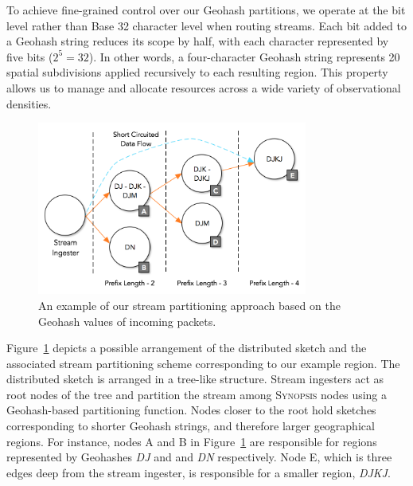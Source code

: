 To achieve fine-grained control over our Geohash partitions, we operate at the bit level rather than Base 32 character level when routing streams. Each bit added to a Geohash string reduces its scope by half, with each character represented by five bits ($2^5 = 32$). In other words, a four-character Geohash string represents 20 spatial subdivisions applied recursively to each resulting region. This property allows us to manage and allocate resources across a wide variety of observational densities.
%
\begin{figure}[h!]
    \centerline{\includegraphics[width=3.5in]{figures/stream-partitioning.png}}
    \caption{An example of our stream partitioning approach based on the Geohash values of incoming packets.}
    \label{fig:stream-partitioning}
\end{figure}
%
Figure~\ref{fig:stream-partitioning} depicts a possible arrangement of the distributed sketch and the associated stream partitioning scheme corresponding to our example region.
The distributed sketch is arranged in a tree-like structure.
Stream ingesters act as root nodes of the tree and partition the stream among \textsc{Synopsis} nodes using a Geohash-based partitioning function.
Nodes closer to the root hold sketches corresponding to shorter Geohash strings, and therefore larger geographical regions.
For instance, nodes A and B in Figure~\ref{fig:stream-partitioning} are responsible for regions represented by Geohashes \emph{DJ} and and \emph{DN} respectively.
Node E, which is three edges deep from the stream ingester, is responsible for a smaller region, \emph{DJKJ}.

